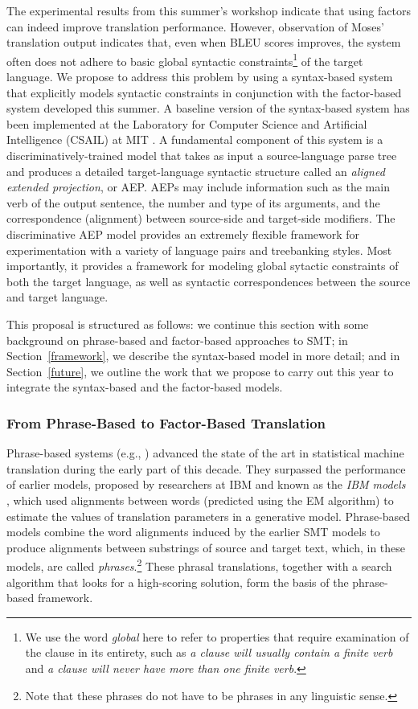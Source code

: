 \documentclass[10pt]{report}
\theoremstyle{plain}
\begin{document}
{The experimental results from this summer's workshop indicate that
using factors can indeed improve translation performance. However,
observation of Moses' translation output indicates that, even when
BLEU scores improves, the system often does not adhere to basic global
syntactic constraints\footnote{We use the word {\em global} here to
refer to properties that require examination of the clause in its
entirety, such as {\em a clause will usually contain a finite verb}
and {\em a clause will never have more than one finite verb}.} of the
target language. We propose to address this problem by using a
syntax-based system that explicitly models syntactic constraints in
conjunction with the factor-based system developed this summer. A
baseline version of the syntax-based system has been implemented at
the Laboratory for Computer Science and Artificial Intelligence
(CSAIL) at MIT . A fundamental component of this system
is a discriminatively-trained model that takes as input a
source-language parse tree and produces a detailed target-language
syntactic structure called an {\em aligned extended projection}, or
AEP. AEPs may include information such as the main verb of the output
sentence, the number and type of its arguments, and the correspondence
(alignment) between source-side and target-side modifiers. The
discriminative AEP model provides an extremely flexible framework for
experimentation with a variety of language pairs and treebanking
styles. Most importantly, it provides a framework for modeling global
sytactic constraints of both the target language, as well as syntactic
correspondences between the source and target language.

This proposal is structured as follows: we continue this section with
some background on phrase-based and factor-based approaches to SMT; in
Section~\ref{framework}, we describe the syntax-based model in more
detail; and in Section~\ref{future}, we outline the work that we
propose to carry out this year to integrate the syntax-based and the
factor-based models.

\subsubsection{From Phrase-Based to Factor-Based Translation}
Phrase-based systems (e.g., )
advanced the state of the art in statistical machine translation
during the early part of this decade. They surpassed the performance
of earlier models, proposed by researchers at IBM and known as the
{\em IBM models} , which used alignments between words
(predicted using the EM algorithm) to estimate the values of
translation parameters in a generative model.  Phrase-based models
combine the word alignments induced by the earlier SMT models to
produce alignments between substrings of source and target text,
which, in these models, are called {\em phrases}.\footnote{Note that
these phrases do not have to be phrases in any linguistic sense.}
These phrasal translations, together with a search algorithm that
looks for a high-scoring solution, form the basis of the phrase-based
framework.

}
\end{document}
